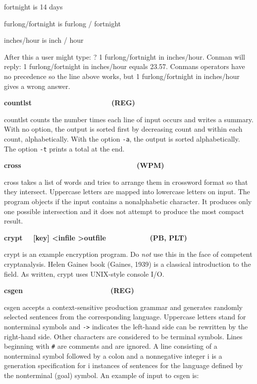 { fortnight is 14 days }

{\sffamily
furlong/fortnight is furlong / fortnight}

{\sffamily
inches/hour is inch / hour }

After this a user might type: ? 1 furlong/fortnight in inches/hour.
Conman will reply: 1 furlong/fortnight in inches/hour equals 23.57.
Conman{\textquotesingle}s operators have no precedence so the line
above works, but 1 furlong/fortnight in inches/hour gives a wrong
answer. 

{\sffamily\bfseries
countlst\ \ \ \ \ \ \ \ \ \ \ \ \ \ \ \ \ \ \ \ (REG)}

\textsf{countlst} counts the number times each line of input occurs and
writes a summary. With no option, the output is sorted first by
decreasing count and within each count, alphabetically. With the option
\texttt{{}-a}, the output is sorted alphabetically. The option
\texttt{{}-t} prints a total at the end.

{\sffamily\bfseries
cross\ \ \ \ \ \ \ \ \ \ \ \ \ \ \ \ \ \ \ \  \ \ \ \ \ \ \ \ \ (WPM)}

\textsf{cross} takes a list of words and tries to arrange them in
crossword format so that they intersect. Uppercase letters are mapped
into lowercase letters on input. The program objects if the input
contains a nonalphabetic character. It produces only one possible
intersection and it does not attempt to produce the most compact
result. 

{\sffamily\bfseries
crypt \ \ \textrm{\textmd{[key] {\textless}infile
{\textgreater}outfile\ \ \ \ \ \ \ \ \ \  \ }}(PB, PLT)}

\textsf{crypt} is an example encryption program. Do
\textit{not} use this in the face of competent cryptanalysis. Helen
Gaines{\textquotesingle} book (Gaines, 1939) is a classical
introduction to the field. As written, \textsf{crypt} uses UNIX-style
console I/O.

{\sffamily\bfseries
csgen\ \ \ \ \ \ \ \ \ \ \ \ \ \ \ \ \ \ \ \ \ \ (REG)}

\textsf{csgen} accepts a context-sensitive production grammar and
generates randomly selected sentences from the corresponding language.
Uppercase letters stand for nonterminal symbols and
\texttt{{}-{\textgreater}} indicates the left-hand side can be
rewritten by the right-hand side. Other characters are considered to be
terminal symbols. Lines beginning with \texttt{\#} are comments and are
ignored. A line consisting of a nonterminal symbol followed by a colon
and a nonnegative integer i is a generation specification for i
instances of sentences for the language defined by the nonterminal
(goal) symbol. An example of input to \textsf{csgen} is:

